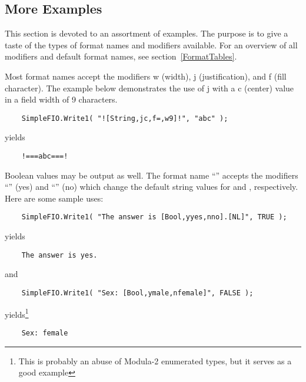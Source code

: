 \subsection{More Examples}

This section is devoted to an assortment of examples.  The purpose
is to give a taste of the types of format names and modifiers available.
For an overview of all modifiers and default format names,
see section~\ref{FormatTables}.

Most format names accept the modifiers w (width), j (justification), 
and f (fill character).  The example below demonstrates the use
of j with a c (center) value in a field width of 9 characters.
\begin{verbatim}
    SimpleFIO.Write1( "![String,jc,f=,w9]!", "abc" );
\end{verbatim}
yields
\begin{verbatim}
    !===abc===!
\end{verbatim}

Boolean values may be output as well.  The format name ``''
accepts the modifiers ``'' (yes) and ``'' (no) which change the
default string values for  and , respectively.
Here are some sample uses:
\begin{verbatim}
    SimpleFIO.Write1( "The answer is [Bool,yyes,nno].[NL]", TRUE );
\end{verbatim}
yields
\begin{verbatim}
    The answer is yes.
\end{verbatim}
and
\begin{verbatim}
    SimpleFIO.Write1( "Sex: [Bool,ymale,nfemale]", FALSE );
\end{verbatim}
yields\footnote{
    This is probably an abuse of Modula-2 enumerated types, but
    it serves as a good example}
\begin{verbatim}
    Sex: female
\end{verbatim}
    
